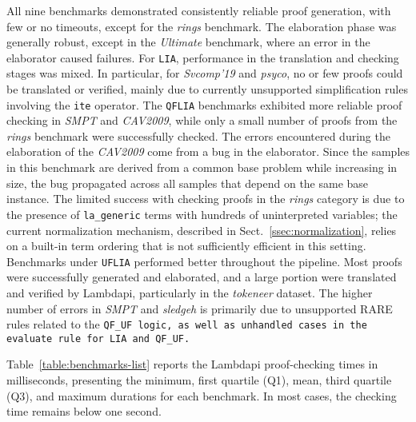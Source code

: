 All nine benchmarks demonstrated consistently reliable proof generation, with few or no timeouts, except for the \emph{rings} benchmark.
The elaboration phase was generally robust, except in the \emph{Ultimate} benchmark, where an error in the elaborator caused failures.
For \texttt{LIA}, performance in the translation and checking stages was mixed. In particular, for \emph{Svcomp'19} and \emph{psyco}, no or few proofs could be translated or verified, mainly due to currently unsupported simplification rules involving the \texttt{ite} operator.
The \texttt{QFLIA} benchmarks exhibited more reliable proof checking in \emph{SMPT} and \emph{CAV2009}, while only a small number of proofs from the \emph{rings} benchmark were successfully checked.
The errors encountered during the elaboration of the \emph{CAV2009} come from a bug in the elaborator. Since the samples in this benchmark are derived from a common base problem while increasing in size, the bug propagated across all samples that depend on the same base instance.
The limited success with checking proofs in the \emph{rings} category is due to the presence of \texttt{la\_generic} terms with hundreds of uninterpreted variables; the current normalization mechanism, described in Sect.~\ref{ssec:normalization}, relies on a built-in term ordering that is not sufficiently efficient in this setting.
Benchmarks under \texttt{UFLIA} performed better throughout the pipeline. Most proofs were successfully generated and elaborated, and a large portion were translated and verified by Lambdapi, particularly in the \emph{tokeneer} dataset.
The higher number of errors in \emph{SMPT} and \emph{sledgeh} is primarily due to unsupported RARE rules related to the \tt{QF\_UF} logic, as well as unhandled cases in the \texttt{evaluate} rule for \texttt{LIA} and \texttt{QF\_UF}.



Table~\ref{table:benchmarks-list} reports the Lambdapi proof-checking times in milliseconds, presenting the minimum, first quartile (Q1), mean, third quartile (Q3), and maximum durations for each benchmark.
In most cases, the checking time remains below one second.
